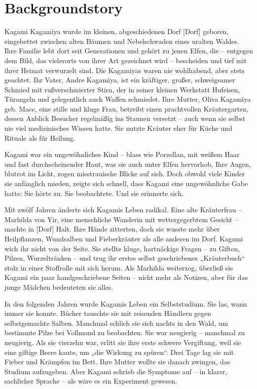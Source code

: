\documentclass[12pt,a4paper]{article}
\begin{document}
\newpage


\section{Backgroundstory}

Kagami Kagamiya wurde im kleinen, abgeschiedenen Dorf [Dorf] geboren, eingebettet zwischen alten Bäumen und Nebelschwaden eines uralten Waldes. Ihre Familie lebt dort seit Generationen und gehört zu jenen Elfen, die – entgegen dem Bild, das vielerorts von ihrer Art gezeichnet wird – bescheiden und tief mit ihrer Heimat verwurzelt sind. Die Kagamiyas waren nie wohlhabend, aber stets geachtet. Ihr Vater, Andre Kagamiya, ist ein kräftiger, großer, schweigsamer Schmied mit rußverschmierter Stirn, der in seiner kleinen Werkstatt Hufeisen, Türangeln und gelegentlich auch Waffen schmiedet. Ihre Mutter, Oliva Kagamiya geb. Mace, eine stille und kluge Frau, betreibt einen prachtvollen Kräutergarten, dessen Anblick Besucher regelmäßig ins Staunen versetzt – auch wenn sie selbst nie viel medizinisches Wissen hatte. Sie nutzte Kräuter eher für Küche und Rituale als für Heilung.

Kagami war ein ungewöhnliches Kind – blass wie Porzellan, mit weißem Haar und fast durchscheinender Haut, was sie auch unter Elfen hervorhob. Ihre Augen, blutrot im Licht, zogen misstrauische Blicke auf sich. Doch obwohl viele Kinder sie anfänglich mieden, zeigte sich schnell, dass Kagami eine ungewöhnliche Gabe hatte: Sie hörte zu. Sie beobachtete. Und sie erinnerte sich.

Mit zwölf Jahren änderte sich Kagamis Leben radikal. Eine alte Kräuterfrau – Marhilda von Yir, eine menschliche Wanderin mit wettergegerbtem Gesicht – machte in [Dorf] Halt. Ihre Hände zitterten, doch sie wusste mehr über Heilpflanzen, Wundsalben und Fieberkräuter als alle anderen im Dorf. Kagami wich ihr nicht von der Seite. Sie stellte kluge, hartnäckige Fragen – zu Giften, Pilzen, Wurzeltränken – und trug ihr erstes selbst geschriebenes „Kräuterbuch“ stolz in einer Stoffrolle mit sich herum. Als Marhilda weiterzog, überließ sie Kagami ein paar handgeschriebene Seiten – nicht mehr als Notizen, aber für das junge Mädchen bedeuteten sie alles.

In den folgenden Jahren wurde Kagamis Leben ein Selbststudium. Sie las, wann immer sie konnte. Bücher tauschte sie mit reisenden Händlern gegen selbstgemachte Salben. Manchmal schlich sie sich nachts in den Wald, um bestimmte Pilze bei Vollmond zu beobachten. Sie war neugierig – manchmal zu neugierig. Als sie vierzehn war, erlitt sie ihre erste schwere Vergiftung, weil sie eine giftige Beere kaute, um „die Wirkung zu spüren“. Drei Tage lag sie mit Fieber und Krämpfen im Bett. Ihre Mutter wollte sie danach zwingen, das Studium aufzugeben. Aber Kagami schrieb die Symptome auf – in klarer, sachlicher Sprache – als wäre es ein Experiment gewesen.
\end{document}
